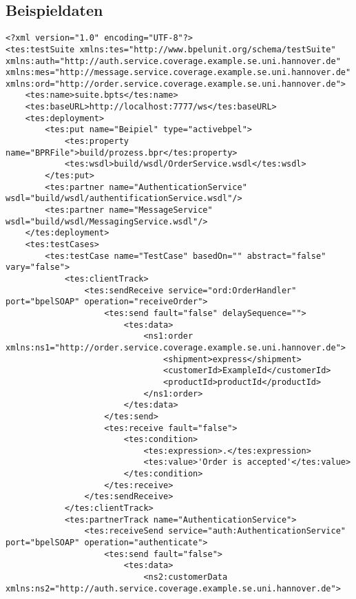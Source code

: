 \begin{appendix}
  \chapter{Beispieldaten}
\begin{tiny}
  \begin{verbatim}
<?xml version="1.0" encoding="UTF-8"?>
<tes:testSuite xmlns:tes="http://www.bpelunit.org/schema/testSuite" 
xmlns:auth="http://auth.service.coverage.example.se.uni.hannover.de" 
xmlns:mes="http://message.service.coverage.example.se.uni.hannover.de" 
xmlns:ord="http://order.service.coverage.example.se.uni.hannover.de">
    <tes:name>suite.bpts</tes:name>
    <tes:baseURL>http://localhost:7777/ws</tes:baseURL>
    <tes:deployment>
        <tes:put name="Beipiel" type="activebpel">
            <tes:property name="BPRFile">build/prozess.bpr</tes:property>
            <tes:wsdl>build/wsdl/OrderService.wsdl</tes:wsdl>
        </tes:put>
        <tes:partner name="AuthenticationService" wsdl="build/wsdl/authentificationService.wsdl"/>
        <tes:partner name="MessageService" wsdl="build/wsdl/MessagingService.wsdl"/>
    </tes:deployment>
    <tes:testCases>
        <tes:testCase name="TestCase" basedOn="" abstract="false" vary="false">
            <tes:clientTrack>
                <tes:sendReceive service="ord:OrderHandler" port="bpelSOAP" operation="receiveOrder">
                    <tes:send fault="false" delaySequence="">
                        <tes:data>
                            <ns1:order xmlns:ns1="http://order.service.coverage.example.se.uni.hannover.de">
                                <shipment>express</shipment>
                                <customerId>ExampleId</customerId>
                                <productId>productId</productId>
                            </ns1:order>
                        </tes:data>
                    </tes:send>
                    <tes:receive fault="false">
                        <tes:condition>
                            <tes:expression>.</tes:expression>
                            <tes:value>'Order is accepted'</tes:value>
                        </tes:condition>
                    </tes:receive>
                </tes:sendReceive>
            </tes:clientTrack>
            <tes:partnerTrack name="AuthenticationService">
                <tes:receiveSend service="auth:AuthenticationService" port="bpelSOAP" operation="authenticate">
                    <tes:send fault="false">
                        <tes:data>
                            <ns2:customerData xmlns:ns2="http://auth.service.coverage.example.se.uni.hannover.de">

\end{verbatim}
\end{tiny}
\end{appendix}
